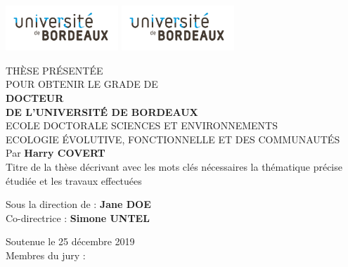 \documentclass[french,12pt,a4paper]{report}
\begin{document}
\pagestyle{empty}
\includegraphics[scale=1, height=1.7cm]{images/brdx.pdf}
\hfill
\includegraphics[scale=1, height=1.7cm]{images/brdx.pdf}
\hfill
\begin{center}
\doublespacing
\begin{Large}

THÈSE PRÉSENTÉE\\ POUR OBTENIR LE GRADE DE \\
{\LARGE \textbf{DOCTEUR\\DE L'UNIVERSITÉ DE BORDEAUX} } \\
\vspace{0.55cm}
ECOLE DOCTORALE SCIENCES ET ENVIRONNEMENTS\\
{\normalsize ECOLOGIE ÉVOLUTIVE, FONCTIONNELLE ET DES COMMUNAUTÉS} \\
\vspace{0.55cm}
Par \textbf{Harry COVERT} \\
\vspace{0.55cm}
{\Large Titre de la thèse décrivant avec les mots clés nécessaires la thématique précise étudiée et les travaux effectuées}
\end{Large}
\vspace{0.55cm}
\begin{normalsize}
\begin{singlespace}
Sous la direction de : \textbf{Jane DOE}\\
Co-directrice : \textbf{Simone UNTEL}
\end{singlespace}
\end{normalsize}
\end{center}
\vfill
{\large Soutenue le 25 décembre 2019 }\\
\vfill
Membres du jury :
\end{document}
